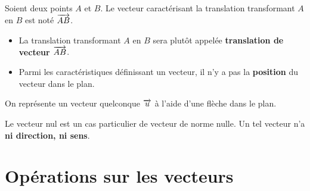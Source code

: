 \documentclass{poly}
\begin{document}
\begin{definition}
Soient deux points $A$ et $B$. Le vecteur caractérisant la translation transformant $A$ en $B$ est noté $\overrightarrow{AB}$.
\end{definition}
\begin{remark}
\hfill
\begin{itemize}
\item La translation transformant $A$ en $B$ sera plutôt appelée \textbf{translation de vecteur $\overrightarrow{AB}$}.
\item Parmi les caractéristiques définissant un vecteur, il n'y a pas la \textbf{position} du vecteur dans le plan.
\end{itemize}
\end{remark}
\begin{example}
On représente un vecteur quelconque $\overrightarrow{u}$ à l'aide d'une flèche dans le plan.
\begin{center}
\end{center}
\end{example}
\begin{remark}
Le vecteur nul est un cas particulier de vecteur de norme nulle. Un tel vecteur n'a \textbf{ni direction, ni sens}.
\end{remark}
\newpage
\section{Opérations sur les vecteurs}
\end{document}
